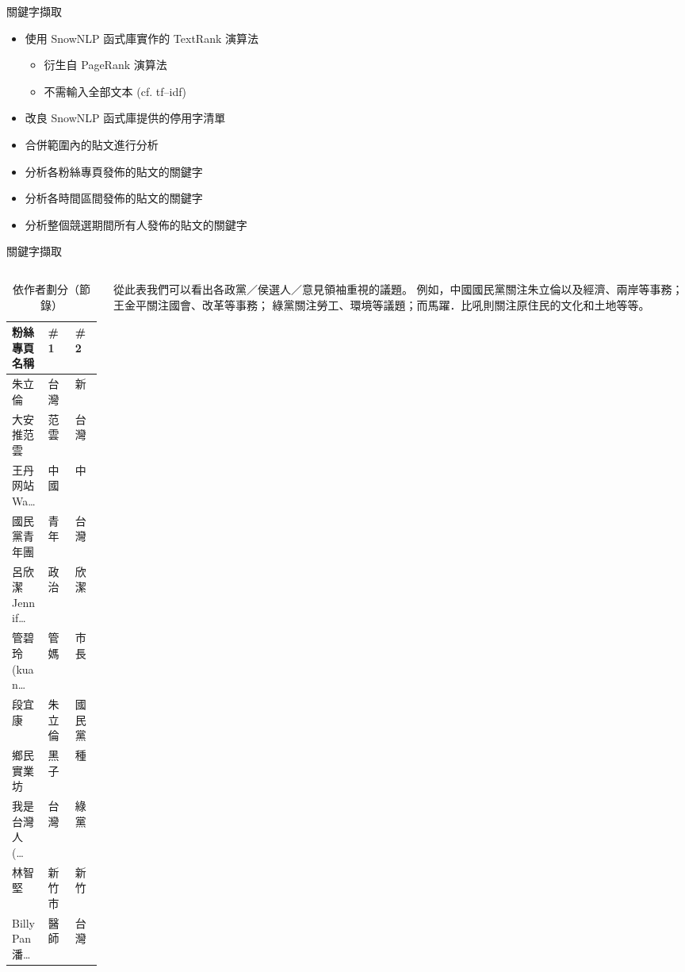 \documentclass{beamer}
\begin{document}
\begin{CJK}{UTF8}{bkai}
\begin{frame}{關鍵字擷取}
\begin{itemize}
\item 使用 SnowNLP 函式庫實作的 TextRank 演算法
  \begin{itemize}
  \item 衍生自 PageRank 演算法
  \item 不需輸入全部文本 (cf. tf--idf)
  \end{itemize}
\item 改良 SnowNLP 函式庫提供的停用字清單
\item 合併範圍內的貼文進行分析
\item 分析各粉絲專頁發佈的貼文的關鍵字
\item 分析各時間區間發佈的貼文的關鍵字
\item 分析整個競選期間所有人發佈的貼文的關鍵字
\end{itemize}
\end{frame}

\begin{frame}{關鍵字擷取}
\begin{columns}
\begin{column}{.64\textwidth}
  \begin{table}
  \caption{依作者劃分（節錄）}
  \begin{tabular}{@{}L{8em}ll@{}}
    \toprule
    粉絲專頁名稱 & \#1 & \#2 \\
    \midrule
    朱立倫 & 台灣 & 新 \\
    大安推范雲 & 范雲 & 台灣 \\
    王丹网站 Wa\dots & 中國 & 中 \\
    國民黨青年團 & 青年 & 台灣 \\
    呂欣潔 Jennif\dots & 政治 & 欣潔 \\
    管碧玲 (kuan\dots & 管媽 & 市長 \\
    段宜康 & 朱立倫 & 國民黨 \\
    鄉民實業坊 & 黑子 & 種 \\
    我是台灣人 (\dots & 台灣 & 綠黨 \\
    林智堅 & 新竹市 & 新竹 \\
    BillyPan 潘\dots & 醫師 & 台灣 \\
    \bottomrule
  \end{tabular}
  \end{table}
\end{column}
\begin{column}{.31\textwidth}
  \qquad 從此表我們可以看出各政黨／侯選人／意見領袖重視的議題。%
  例如，中國國民黨關注朱立倫以及經濟、兩岸等事務；王金平關注國會、改革等事務；%
  綠黨關注勞工、環境等議題；而馬躍．比吼則關注原住民的文化和土地等等。%
\end{column}
\end{columns}
\end{frame}


\end{CJK}
\end{document}

